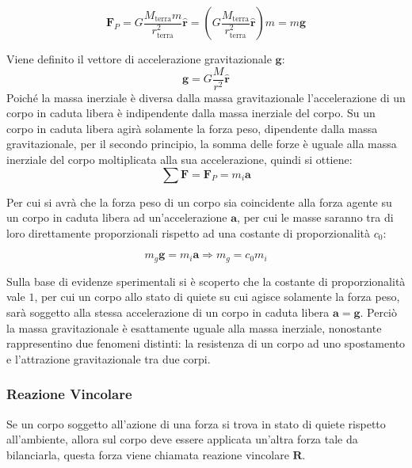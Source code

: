 \documentclass{article}
\newcommand{\vect}[1]{\boldsymbol{\mathbf{#1}}}
\numberwithin{equation}{subsection}
\begin{document}
\begin{equation}
    \vect{F}_P=G\displaystyle\frac{M_\mathrm{terra}m}{r_\mathrm{terra}^{2}}\hat{\vect{r}}=\left(G\frac{M_\mathrm{terra}}{r_\mathrm{terra}^{2}}\hat{\vect{r}}\right)m=m\vect{g}
\end{equation}

Viene definito il vettore di accelerazione gravitazionale $\vect{g}$:
\begin{equation}
    \vect{g}=G\displaystyle\frac{M}{r^{2}}\hat{\vect{r}}
\end{equation}
Poiché la massa inerziale è diversa dalla massa gravitazionale 
l'accelerazione di un corpo in caduta libera è indipendente 
dalla massa inerziale del corpo. Su un corpo in caduta libera agirà solamente la forza peso, dipendente dalla massa gravitazionale, per il secondo 
principio, la somma delle forze è uguale alla massa inerziale del corpo moltiplicata alla sua accelerazione, quindi si ottiene: 
\begin{equation*}
    \sum\vect{F}=\vect{F}_P=m_i\vect{a}
\end{equation*}

Per cui si avrà che la forza peso di un corpo sia coincidente alla forza agente su un corpo in caduta libera ad un'accelerazione $\vect{a}$, 
per cui le masse saranno tra di loro direttamente proporzionali rispetto ad una costante di proporzionalità $c_0$:

\begin{equation*}
    m_g\vect{g}=m_i\vect{a}\Rightarrow m_g=c_0m_i
\end{equation*}

Sulla base di evidenze sperimentali si è scoperto che la costante di proporzionalità vale $1$, per cui un corpo allo stato di quiete su cui agisce 
solamente la forza peso, sarà soggetto alla stessa accelerazione di un corpo in caduta libera $\vect{a}=\vect{g}$. Perciò la massa gravitazionale è 
esattamente uguale alla massa inerziale, nonostante rappresentino due fenomeni distinti: la resistenza di un corpo ad uno spostamento e 
l'attrazione gravitazionale tra due corpi.

\subsubsection{Reazione Vincolare}

Se un corpo soggetto all'azione di una forza si trova in stato di quiete rispetto all'ambiente, allora sul corpo deve essere applicata un'altra forza tale da bilanciarla, 
questa forza viene chiamata reazione vincolare $\vect{R}$. 
\end{document}
